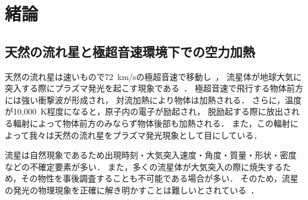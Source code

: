 \chapter{緒論}
\label{chap:intro}
\section{天然の流れ星と極超音速環境下での空力加熱}
天然の流れ星は速いもので72~km/sの極超音速で移動し~\cite{williams2004velocity}，
流星体が地球大気に突入する際にプラズマ発光を起こす現象である~\cite{nagasawa1997,ceplecha1998meteor,ayers1965luminous,abe2008meteoroids}．
極超音速で飛行する物体前方には強い衝撃波が形成され，
対流加熱により物体は加熱される．
さらに，温度が10,000~K程度になると，原子内の電子が励起され，
脱励起する際に放出される輻射によって物体前方のみならず物体後部も加熱される．
また，この輻射によって我々は天然の流れ星をプラズマ発光現象として目にしている．

流星は自然現象であるため出現時刻・大気突入速度・角度・質量・形状・密度
などの不確定要素が多い．
また，多くの流星体が大気突入の際に焼失するため，その物性を事後調査することも不可能である場合が多い．
そのため，流星の発光の物理現象を正確に解き明かすことは難しいとされている~\cite{ceplecha1998meteor}．

